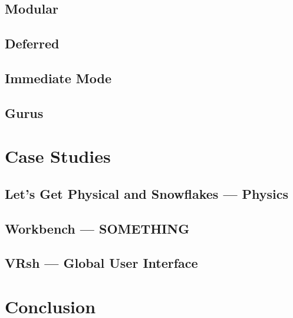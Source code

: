 \documentclass[conference,12pt]{IEEEtran}
\newcommand\name{VRsh}
\begin{document}
\subsection{Modular}

\subsection{Deferred}

\subsection{Immediate Mode}

\subsection{Gurus} %


\section{Case Studies}\label{sec:case-studies}

\subsection{Let's Get Physical and Snowflakes --- Physics}

\subsection{Workbench --- SOMETHING} %

\subsection{{\name} --- Global User Interface}

\section{Conclusion}\label{sec:conclusion}

{\printbibliography}
\end{document}
